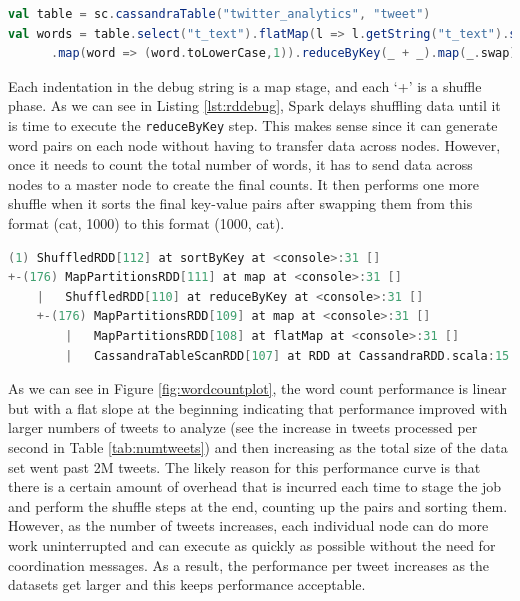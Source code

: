 \begin{lstlisting}[language=scala, caption={WordCount Spark script},float, floatplacement=H, label={lst:wordcount}]
val table = sc.cassandraTable("twitter_analytics", "tweet")
val words = table.select("t_text").flatMap(l => l.getString("t_text").split(" "))
      .map(word => (word.toLowerCase,1)).reduceByKey(_ + _).map(_.swap).sortByKey(false,1)
\end{lstlisting}

Each indentation in the debug string is a map stage, and each `+' is a shuffle phase. As we can see in Listing \ref{lst:rddebug}, Spark delays shuffling data until it is time to execute the \texttt{reduceByKey} step. This makes sense since it can generate word pairs on each node without having to transfer data across nodes. However, once it needs to count the total number of words, it has to send data across nodes to a master node to create the final counts. It then performs one more shuffle when it sorts the final key-value pairs after swapping them from this format (cat, 1000) to this format (1000, cat).

\begin{lstlisting}[language=scala, caption={Debug string rdd}, float, floatplacement=H, label={lst:rddebug}]
(1) ShuffledRDD[112] at sortByKey at <console>:31 []
+-(176) MapPartitionsRDD[111] at map at <console>:31 []
    |   ShuffledRDD[110] at reduceByKey at <console>:31 []
    +-(176) MapPartitionsRDD[109] at map at <console>:31 []
        |   MapPartitionsRDD[108] at flatMap at <console>:31 []
        |   CassandraTableScanRDD[107] at RDD at CassandraRDD.scala:15 []
\end{lstlisting}

As we can see in Figure \ref{fig:wordcountplot},  the word count performance is linear but with a flat slope at the beginning indicating that performance improved with larger numbers of tweets to analyze (see the increase in tweets processed per second in Table \ref{tab:numtweets}) and then increasing as the total size of the data set went past 2M tweets. The likely reason for this performance curve is that there is a certain amount of overhead that is incurred each time to stage the job and perform the shuffle steps at the end, counting up the pairs and sorting them. However, as the number of tweets increases, each individual node can do more work uninterrupted and can execute as quickly as possible without the need for coordination messages. As a result, the performance per tweet increases as the datasets get larger and this keeps performance acceptable.

